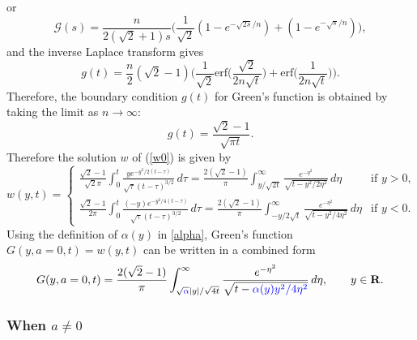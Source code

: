 \documentclass[11pt]{amsart}
\def\blue{\color{blue}}
\def\R{{\bf R}}
\def\R{\mathbb{R}}
\def\R{{\bf R}}
\def\erf{\mathrm{erf}}
\begin{document}
or
\[ \mathcal{G} (s) = \frac{n}{2(\sqrt{2}+1) s} \Big( \frac{1}{\sqrt{2}} (1 - e^{-\sqrt{2s}/n}) + (1 - e^{-\sqrt{s}/n}) \Big),\]
and the inverse Laplace transform gives
\[ g(t) = \frac{n}{2} (\sqrt{2} - 1) \Big( \frac{1}{\sqrt{2}} \erf\big( \frac{\sqrt{2}}{2n\sqrt{t}} \big) + \erf \big( \frac{1}{2n \sqrt{t}} \big) \Big). \]
Therefore, the boundary condition $g(t)$ for Green's function is obtained by taking the limit as $n \to \infty$:
\[ g(t) = \frac{\sqrt{2} - 1}{\sqrt{\pi t}}. \]
Therefore the solution $w$ of (\ref{w0}) is given by
\[w(y,t)=\begin{cases}
\frac{\sqrt{2}-1}{\sqrt{2} \pi} \int_0^t \frac{y e^{-y^2/2(t-\tau)}}{\sqrt{\tau} (t-\tau)^{3/2}} \,d\tau = \frac{2 (\sqrt{2}-1)}{\pi} \int_{y/\sqrt{2t}}^\infty \frac{e^{-\eta^2}}{\sqrt{t - y^2/2\eta^2}} \,d\eta & \text{if $y > 0$,} \\
\frac{\sqrt{2}-1}{2\pi} \int_0^t \frac{(-y) e^{-y^2/4(t-\tau)}}{\sqrt{\tau} (t-\tau)^{3/2}} \,d\tau = \frac{2 (\sqrt{2}-1)}{\pi} \int_{-y/2\sqrt{t}}^\infty \frac{e^{-\eta^2}}{\sqrt{t-y^2/4\eta^2}}\,d\eta & \text{if $y < 0$.}
\end{cases}\]
Using the definition of $\alpha(y)$ in \eqref{alpha}, Green's function $G(y,a=0,t)=w(y,t)$ can be written in a combined form
\begin{equation}\label{G0}
G(y,a=0,t)=\frac{2(\sqrt{2}-1)}{\pi} \int_{\sqrt{\blue \alpha}|y|/\sqrt{4t}}^\infty \frac{e^{-\eta^2}}{\sqrt{t-\blue \alpha(y)y^2/4\eta^2}}\,d\eta,\qquad y\in\R.
\end{equation}



\subsubsection{When $a\ne0$}
\end{document}
